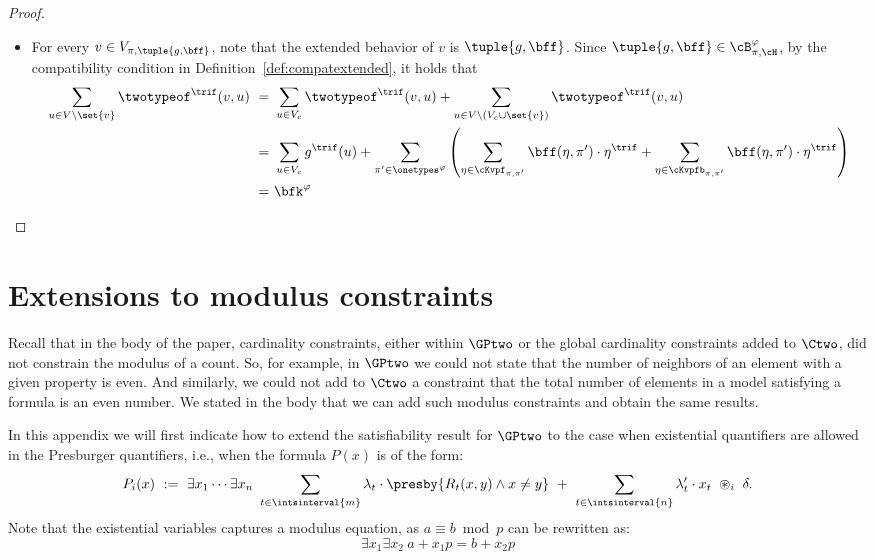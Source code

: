 \begin{proof}
\begin{itemize}
        \item
        For every $v \in V_{\pi, \tuple{g, \bff}}$,
        note that the extended behavior of $v$ is $\tuple{g, \bff}$.
        Since $\tuple{g, \bff} \in \cB^\varphi_{\pi, \cH}$,
        by the compatibility condition in Definition~\ref{def:compatextended}, it holds that
        \begin{equation*}
            \begin{aligned}
                \sum_{u \in V \setminus \set{v}} \twotypeof^\trif(v, u)
                \ =\ &
                \sum_{u \in V_c} \twotypeof^\trif(v, u) +
                \sum_{u \in V \setminus (V_c \cup \set{v})} \twotypeof^\trif(v, u) \\
                \ =\ &
                \sum_{u \in V_c} g^\trif(u) + 
                \sum_{\pi' \in \onetypes^\varphi}
                \left(
                    \sum_{\eta \in \cKvpf_{\pi, \pi'}} \bff(\eta, \pi') \cdot \eta^\trif +
                    \sum_{\eta \in \cKvpfb_{\pi, \pi'}} \bff(\eta, \pi') \cdot \eta^\trif
                \right) \\
                \ =\ &\bfk^\varphi
            \end{aligned}
        \end{equation*}
    \end{itemize}
\end{proof}

\section{Extensions to modulus constraints}

Recall that in the body of the paper, cardinality constraints, either within $\GPtwo$ or the global cardinality constraints added to $\Ctwo$, did not constrain the modulus of a count. So, for example, in $\GPtwo$ we could not state that the number of neighbors of an element with a given property is even. And similarly, we could not add to $\Ctwo$ a  constraint that the total number of elements in a model satisfying a formula is an even number. We stated in the body that we can add such modulus constraints and obtain the same results.

In this appendix we will first indicate how to extend the satisfiability result for $\GPtwo$ to the case when existential quantifiers are allowed in the Presburger quantifiers, i.e., when the formula $P(x)$ is of the form:
\begin{equation*}
P_i(x)\ :=\ 
\exists x_1 \cdots \exists x_n\ \sum_{t \in \intsinterval{m}} \lambda_{t} \cdot \presby{R_t(x, y) \land x \neq y}
\ + \ \sum_{t\in \intsinterval{n}} \lambda_t'\cdot x_t
\ \circledast_i\ \delta.
\end{equation*}
Note that the existential variables captures a modulus equation, as $a \equiv b \bmod p$ can be rewritten as:
$$
\exists x_1\exists x_2\
a+x_1p = b+x_2p
$$

